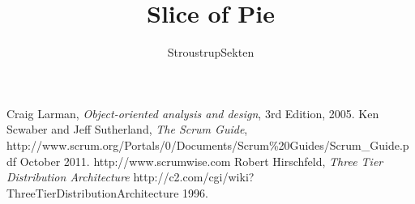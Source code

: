 \documentclass[a4paper,11pt]{article}
\author{StroustrupSekten}
\title{Slice of Pie}
\begin{document}
\maketitle

\tableofcontents
\newpage







\begin{thebibliography}{9}
    Craig Larman,
    \emph{Object-oriented analysis and design},
    3rd Edition,
    2005.
    Ken Scwaber and Jeff Sutherland,
    \emph{The Scrum Guide},
    http://www.scrum.org/Portals/0/Documents/Scrum\%20Guides/Scrum\_Guide.pdf
    October 2011.
  http://www.scrumwise.com
  Robert Hirschfeld,
  \emph{Three Tier Distribution Architecture}
  http://c2.com/cgi/wiki?ThreeTierDistributionArchitecture
  1996.
\end{thebibliography}
\end{document}
